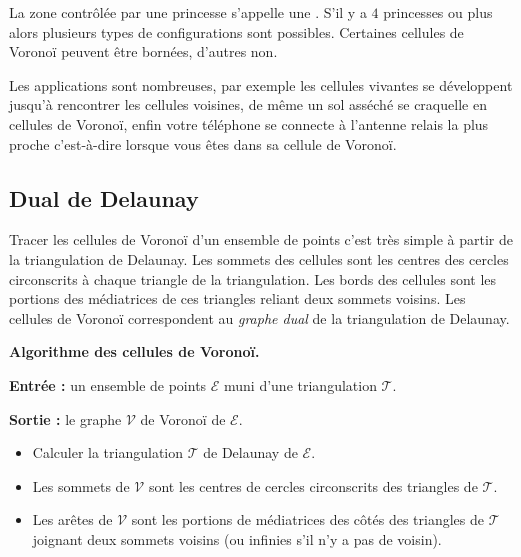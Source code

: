 \documentclass[11pt,class=report,crop=false]{standalone}
\begin{document}

La zone contrôlée par une princesse s'appelle une .
S'il y a $4$ princesses ou plus alors plusieurs types de configurations sont possibles. Certaines cellules de Voronoï peuvent être bornées, d'autres non.




Les applications sont nombreuses, par exemple les cellules vivantes se développent jusqu'à rencontrer les cellules voisines, de même un sol asséché se craquelle en cellules de Voronoï,
enfin votre téléphone se connecte à l'antenne relais la plus proche c'est-à-dire lorsque vous êtes dans sa cellule de Voronoï.


\subsection{Dual de Delaunay}

Tracer les cellules de Voronoï d'un ensemble de points c'est très simple à partir de la triangulation de Delaunay. Les sommets des cellules sont les centres des cercles circonscrits à chaque triangle de la triangulation. Les bords des cellules sont les portions des médiatrices de ces triangles reliant deux sommets voisins.
Les cellules de Voronoï correspondent au \emph{graphe dual} de la triangulation de Delaunay.

\begin{algorithme}
\textbf{Algorithme des cellules de Voronoï.}

\textbf{Entrée :} un ensemble de points $\mathcal{E}$ muni d'une triangulation $\mathcal{T}$.

\textbf{Sortie :} le graphe $\mathcal{V}$ de Voronoï de $\mathcal{E}$.

\begin{itemize}
	\item Calculer la triangulation $\mathcal{T}$ de Delaunay de $\mathcal{E}$.
	\item Les sommets de $\mathcal{V}$ sont les centres de cercles circonscrits des triangles de $\mathcal{T}$.
	\item Les arêtes de $\mathcal{V}$ sont les portions de médiatrices des côtés des triangles de $\mathcal{T}$ joignant deux sommets voisins (ou infinies s'il n'y a pas de voisin).
\end{itemize}	
\end{algorithme}
	
\end{document}
